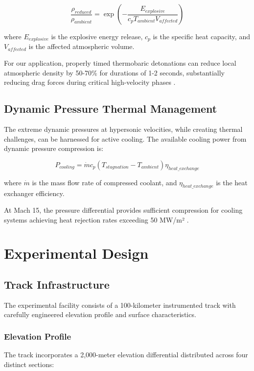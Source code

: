 \documentclass[12pt,a4paper]{article}
\begin{document}
\begin{equation}
\frac{\rho_{reduced}}{\rho_{ambient}} = \exp\left(-\frac{E_{explosive}}{c_p T_{ambient} V_{affected}}\right)
\label{eq:density_reduction}
\end{equation}

where $E_{explosive}$ is the explosive energy release, $c_p$ is the specific heat capacity, and $V_{affected}$ is the affected atmospheric volume.

For our application, properly timed thermobaric detonations can reduce local atmospheric density by 50-70\% for durations of 1-2 seconds, substantially reducing drag forces during critical high-velocity phases \cite{baker1983explosions}.

\subsection{Dynamic Pressure Thermal Management}

The extreme dynamic pressures at hypersonic velocities, while creating thermal challenges, can be harnessed for active cooling. The available cooling power from dynamic pressure compression is:

\begin{equation}
P_{cooling} = \dot{m} c_p (T_{stagnation} - T_{ambient}) \eta_{heat\_exchange}
\label{eq:cooling_power}
\end{equation}

where $\dot{m}$ is the mass flow rate of compressed coolant, and $\eta_{heat\_exchange}$ is the heat exchanger efficiency.

At Mach 15, the pressure differential provides sufficient compression for cooling systems achieving heat rejection rates exceeding 50 MW/m² \cite{heiser1994hypersonic}.

\section{Experimental Design}

\subsection{Track Infrastructure}

The experimental facility consists of a 100-kilometer instrumented track with carefully engineered elevation profile and surface characteristics.

\subsubsection{Elevation Profile}
The track incorporates a 2,000-meter elevation differential distributed across four distinct sections:
\end{document}

